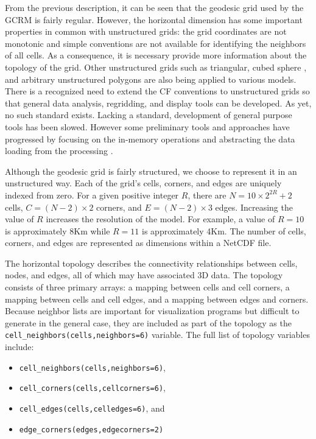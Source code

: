 From the previous description, it can be seen that the geodesic grid used by
the GCRM is fairly regular.  However, the horizontal dimension has some
important properties in common with unstructured grids: the grid coordinates
are not monotonic and simple conventions are not available for identifying the
neighbors of all cells.  As a consequence, it is necessary provide more
information about the topology of the grid.  Other unstructured grids such as
triangular, cubed sphere \cite{CUBE}, and arbitrary unstructured polygons are
also being applied to various models.  There is a recognized need to extend
the CF conventions to unstructured grids so that general data analysis,
regridding, and display tools can be developed.  As yet, no such standard
exists.  Lacking a standard, development of general purpose tools has been
slowed.  However some preliminary tools and approaches have progressed by
focusing on the in-memory operations and abstracting the data loading from the
processing \cite{UGRID}. 

Although the geodesic grid is fairly structured, we choose to represent it in
an unstructured way.  Each of the grid's cells, corners, and edges are
uniquely indexed from zero.  For a given positive integer $R$, there are $N =
10 \times 2^{2R} + 2$ cells, $C = (N-2) \times 2$ corners, and $E = (N-2)
\times 3$ edges.  Increasing the value of $R$ increases the resolution of the
model.  For example, a value of $R=10$ is approximately 8Km while $R=11$ is
approximately 4Km.  The number of cells, corners, and edges are represented as
dimensions within a NetCDF file.

The horizontal topology describes the connectivity relationships between
cells, nodes, and edges, all of which may have associated 3D data.  The
topology consists of three primary arrays: a mapping between cells and cell
corners, a mapping between cells and cell edges, and a mapping between edges
and corners.  Because neighbor lists are important for visualization programs
but difficult to generate in the general case, they are included as part of
the topology as the \verb+cell_neighbors(cells,neighbors=6)+ variable.  The
full list of topology variables include:

\begin{itemize}
\item \verb+cell_neighbors(cells,neighbors=6)+,
\item \verb+cell_corners(cells,cellcorners=6)+,
\item \verb+cell_edges(cells,celledges=6)+, and
\item \verb+edge_corners(edges,edgecorners=2)+
\end{itemize}

